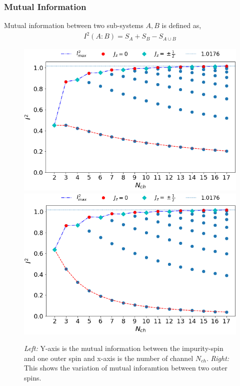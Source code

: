 \documentclass[reprint,prb,superscriptaddress]{revtex4-1}
\begin{document}
\subsubsection{Mutual Information}

Mutual information between two sub-systems $A, B$ is defined as, 
\begin{eqnarray}
I^2(A:B)=S_A+S_B-S_{A\cup B}
\end{eqnarray}

\begin{figure}[!h]
\includegraphics[scale=0.32]{plt/I_2_vs_Nch_0_1}
\includegraphics[scale=0.32]{plt/I_2_vs_Nch_1_2}
\caption{\textit{Left:} Y-axis is the mutual information between the impurity-spin and one outer spin and x-axis is the number of channel $N_{ch}$. \textit{Right:} This shows the variation of mutual inforamtion between two outer spins.}
\label{fig:MI_vs_Nch}
\end{figure}
\end{document}
